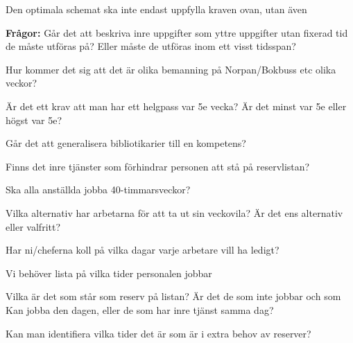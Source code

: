 Den optimala schemat ska inte endast uppfylla kraven ovan, utan även 

\textbf{Frågor:} Går det att beskriva inre uppgifter som yttre uppgifter utan fixerad tid de måste utföras på? Eller måste de utföras inom ett visst tidsspan?

Hur kommer det sig att det är olika bemanning på Norpan/Bokbuss etc olika veckor?

Är det ett krav att man har ett helgpass var 5e vecka? Är det minst var 5e eller högst var 5e?

Går det att generalisera bibliotikarier till en kompetens?

Finns det inre tjänster som förhindrar personen att stå på reservlistan?

Ska alla anställda jobba 40-timmarsveckor?

Vilka alternativ har arbetarna för att ta ut sin veckovila? Är det ens alternativ eller valfritt?

Har ni/cheferna koll på vilka dagar varje arbetare vill ha ledigt?

Vi behöver lista på vilka tider personalen jobbar

Vilka är det som står som reserv på listan? Är det de som inte jobbar och som Kan jobba den dagen, eller de som har inre tjänst samma dag?

Kan man identifiera vilka tider det är som är i extra behov av reserver?